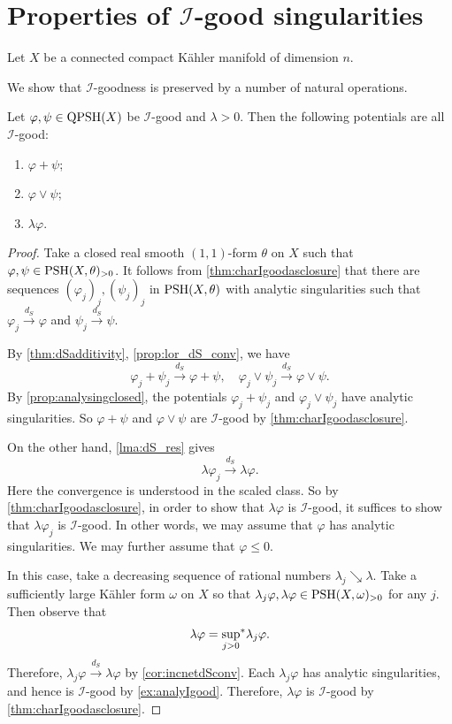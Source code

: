\section{Properties of \texorpdfstring{$\mathcal{I}$}{I}-good singularities}\label{sec:Igoodprop}
Let $X$ be a connected compact Kähler manifold of dimension $n$.



We show that $\mathcal{I}$-goodness is preserved by a number of natural operations.
\begin{proposition}\label{prop:Igoodlinear}
    Let $\varphi,\psi\in \QPSH(X)$ be $\mathcal{I}$-good and $\lambda>0$. Then the following potentials are all $\mathcal{I}$-good:
    \begin{enumerate}
        \item\label{itm:prop:Igoodlinear:1} $\varphi+\psi$;
        \item\label{itm:prop:Igoodlinear:2} $\varphi\lor \psi$;
        \item\label{itm:prop:Igoodlinear:3} $\lambda\varphi$.
    \end{enumerate}
\end{proposition}
\begin{proof}
    Take a closed real smooth $(1,1)$-form $\theta$ on $X$ such that $\varphi,\psi\in \PSH(X,\theta)_{>0}$. It follows from \cref{thm:charIgoodasclosure} that there are sequences $(\varphi_j)_j,(\psi_j)_j$ in $\PSH(X,\theta)$ with analytic singularities such that $\varphi_j\xrightarrow{d_S}\varphi$ and $\psi_j\xrightarrow{d_S}\psi$.

    By \cref{thm:dSadditivity}, \cref{prop:lor_dS_conv}, we have
    \[
        \varphi_j+\psi_j\xrightarrow{d_S}\varphi+\psi,\quad \varphi_j\lor\psi_j\xrightarrow{d_S}\varphi\lor\psi.
    \]
    By \cref{prop:analysingclosed}, the potentials $\varphi_j+\psi_j$ and $\varphi_j\lor\psi_j$ have analytic singularities. So $\varphi+\psi$ and $\varphi\lor\psi$ are $\mathcal{I}$-good by \cref{thm:charIgoodasclosure}.

    On the other hand, \cref{lma:dS_res} gives
    \[
        \lambda \varphi_j\xrightarrow{d_S}\lambda \varphi.
    \]
    Here the convergence is understood in the scaled class. So by \cref{thm:charIgoodasclosure}, in order to show that $\lambda\varphi$ is $\mathcal{I}$-good, it suffices to show that $\lambda \varphi_j$ is $\mathcal{I}$-good. In other words, we may assume that $\varphi$ has analytic singularities. We may further assume that $\varphi\leq 0$.

    In this case, take a decreasing sequence of rational numbers $\lambda_j\searrow \lambda$. Take a sufficiently large Kähler form $\omega$ on $X$ so that $\lambda_j\varphi,\lambda\varphi\in \PSH(X,\omega)_{>0}$ for any $j$. Then observe that
    \[
        \lambda\varphi=\uscsup[j>0] \lambda_j \varphi.
    \]
    Therefore, $\lambda_j\varphi\xrightarrow{d_S} \lambda \varphi$ by \cref{cor:incnetdSconv}. Each $\lambda_j \varphi$ has analytic singularities, and hence is $\mathcal{I}$-good by \cref{ex:analyIgood}. Therefore, $\lambda\varphi$ is $\mathcal{I}$-good by \cref{thm:charIgoodasclosure}.
\end{proof}

